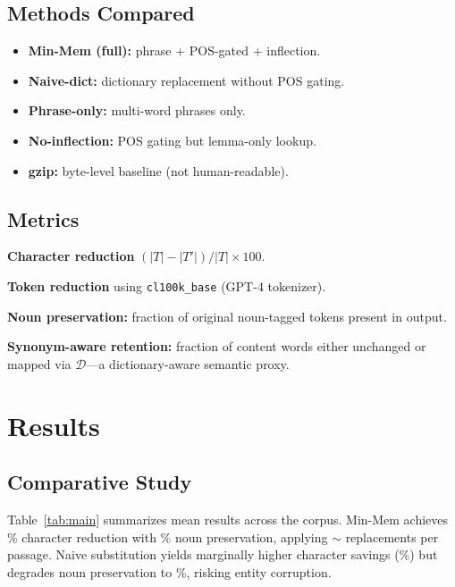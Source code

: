 \documentclass[10pt,twocolumn]{article}
\begin{document}
\subsection{Methods Compared}

\begin{itemize}
    \item \textbf{Min-Mem (full):} phrase + POS-gated + inflection.
    \item \textbf{Naive-dict:} dictionary replacement without POS gating.
    \item \textbf{Phrase-only:} multi-word phrases only.
    \item \textbf{No-inflection:} POS gating but lemma-only lookup.
    \item \textbf{gzip:} byte-level baseline (not human-readable).
\end{itemize}

\subsection{Metrics}

\textbf{Character reduction} $(|T|-|T'|)/|T| \times 100$.

\textbf{Token reduction} using \texttt{cl100k\_base} (GPT-4 tokenizer).

\textbf{Noun preservation:} fraction of original noun-tagged tokens present in output.

\textbf{Synonym-aware retention:} fraction of content words either unchanged or mapped via $\mathcal{D}$---a dictionary-aware semantic proxy.

\section{Results}
\label{sec:results}

\subsection{Comparative Study}

Table~\ref{tab:main} summarizes mean results across the corpus. Min-Mem achieves \MinMemCharSavings\% character reduction with \MinMemNounPres\% noun preservation, applying $\sim$\MinMemSwaps{} replacements per passage. Naive substitution yields marginally higher character savings (\NaiveCharSavings\%) but degrades noun preservation to \NaiveNounPres\%, risking entity corruption.
\end{document}
